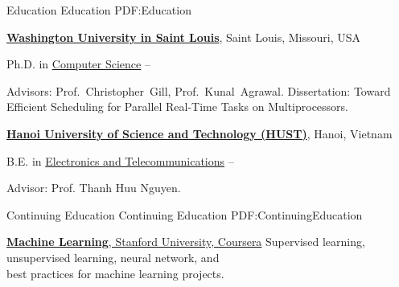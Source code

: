 \documentclass[letterpaper,MMMyyyy,nonstopmode]{simpleresumecv}
\begin{document}
\begin{Body}


\Section
{Education}
{Education}
{PDF:Education}

\Entry
\href{https://wustl.edu}
{\textbf{Washington University in Saint Louis}},
Saint Louis, Missouri, USA

\Gap
\BulletItem
Ph.D. in 
\href{https://cse.wustl.edu/Pages/default.aspx}
{Computer Science}
\hfill
{} -- 
\begin{Detail}
\SubBulletItem
Advisors:
Prof.~Christopher~Gill, Prof.~Kunal~Agrawal.
\SubBulletItem
Dissertation: Toward Efficient Scheduling for Parallel Real-Time Tasks on Multiprocessors.
\end{Detail}



\BigGap
\Entry
\href{https://en.hust.edu.vn/home}
{\textbf{Hanoi University of Science and Technology (HUST)}},
Hanoi, Vietnam

\Gap
\BulletItem
B.E. in
\href{http://set.hust.edu.vn/index.php/en}
{Electronics and Telecommunications}
\hfill
{} --
\begin{Detail}
\SubBulletItem
Advisor: Prof. Thanh Huu Nguyen.
\end{Detail}


\Section
{Continuing Education}
{Continuing Education}
{PDF:ContinuingEducation}

\Entry
\href{https://www.coursera.org/account/accomplishments/certificate/HZCT9RFV84YS}
{\textbf{Machine Learning}, Stanford University, Coursera}
\hfill {}
\BulletItem
Supervised learning, unsupervised learning, neural network, and \\
best practices for machine learning projects.


\end{Body}
\end{document}

